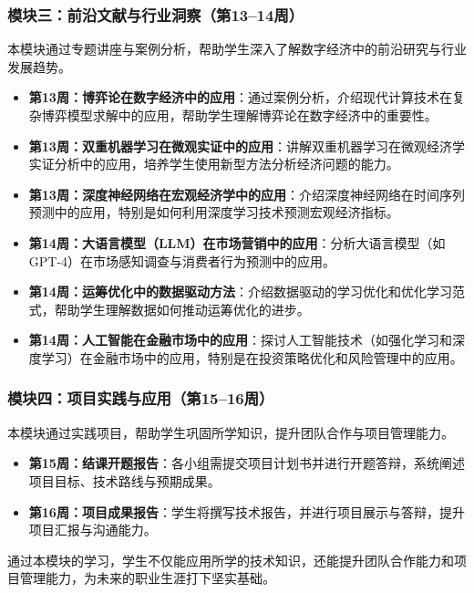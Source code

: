 \documentclass[lang=cn,12pt,a4paper]{elegantpaper}
\begin{document}
\subsubsection{模块三：前沿文献与行业洞察（第13--14周）} \label{sec:module3}
本模块通过专题讲座与案例分析，帮助学生深入了解数字经济中的前沿研究与行业发展趋势。
\begin{itemize}
    \item \textbf{第13周：博弈论在数字经济中的应用}：通过案例分析，介绍现代计算技术在复杂博弈模型求解中的应用，帮助学生理解博弈论在数字经济中的重要性\citep{sandholm2010state,hu2023recent}。
    \item \textbf{第13周：双重机器学习在微观实证中的应用}：讲解双重机器学习在微观经济学实证分析中的应用，培养学生使用新型方法分析经济问题的能力\citep{chernozhukov2018double,athey2019machine}。
    \item \textbf{第13周：深度神经网络在宏观经济学中的应用}：介绍深度神经网络在时间序列预测中的应用，特别是如何利用深度学习技术预测宏观经济指标\citep{lim2021time,benidis2022deep}。
    \item \textbf{第14周：大语言模型（LLM）在市场营销中的应用}：分析大语言模型（如GPT-4）在市场感知调查与消费者行为预测中的应用\citep{wang2024large,arora2025ai}。
    \item \textbf{第14周：运筹优化中的数据驱动方法}：介绍数据驱动的学习优化和优化学习范式，帮助学生理解数据如何推动运筹优化的进步\citep{andrychowicz2016learning,chen2022learning}。
    \item \textbf{第14周：人工智能在金融市场中的应用}：探讨人工智能技术（如强化学习和深度学习）在金融市场中的应用，特别是在投资策略优化和风险管理中的应用\citep{huang2024multi,yang2024finrobot}。
\end{itemize}

\subsubsection{模块四：项目实践与应用（第15--16周）} \label{sec:module4}
本模块通过实践项目，帮助学生巩固所学知识，提升团队合作与项目管理能力。
\begin{itemize}
    \item \textbf{第15周：结课开题报告}：各小组需提交项目计划书并进行开题答辩，系统阐述项目目标、技术路线与预期成果。
    \item \textbf{第16周：项目成果报告}：学生将撰写技术报告，并进行项目展示与答辩，提升项目汇报与沟通能力。
\end{itemize}

通过本模块的学习，学生不仅能应用所学的技术知识，还能提升团队合作能力和项目管理能力，为未来的职业生涯打下坚实基础。
\end{document}
